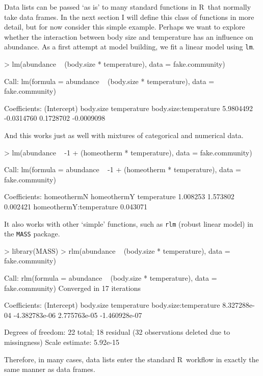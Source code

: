 \documentclass{article}
\newcommand{\R}{{\sf R}}
\newcommand{\code}[1]{\texttt{#1}}
\numberwithin{exercise}{section}
\begin{document}
Data lists can be passed `as is' to many standard functions in \R\ that normally take data frames.  In the next section I will define this class of functions in more detail, but for now consider this simple example.  Perhaps we want to explore whether the interaction between body size and temperature has an influence on abundance.  As a first attempt at model building, we fit a linear model using \code{lm}.
\begin{Schunk}
\begin{Sinput}
> lm(abundance ~ (body.size * temperature), data = fake.community)
\end{Sinput}
\begin{Soutput}
Call:
lm(formula = abundance ~ (body.size * temperature), data = fake.community)

Coefficients:
          (Intercept)              body.size            temperature  body.size:temperature  
            5.9804492             -0.0314760              0.1728702             -0.0009098  
\end{Soutput}
\end{Schunk}
And this works just as well with mixtures of categorical and numerical data.
\begin{Schunk}
\begin{Sinput}
> lm(abundance ~ -1 + (homeotherm * temperature), data = fake.community)
\end{Sinput}
\begin{Soutput}
Call:
lm(formula = abundance ~ -1 + (homeotherm * temperature), data = fake.community)

Coefficients:
            homeothermN              homeothermY              temperature  
               1.008253                 1.573802                 0.002421  
homeothermY:temperature  
               0.043071  
\end{Soutput}
\end{Schunk}
It also works with other `simple' functions, such as \code{rlm} (robust linear model) in the \code{MASS} package.
\begin{Schunk}
\begin{Sinput}
> library(MASS)
> rlm(abundance ~ (body.size * temperature), data = fake.community)
\end{Sinput}
\begin{Soutput}
Call:
rlm(formula = abundance ~ (body.size * temperature), data = fake.community)
Converged in 17 iterations

Coefficients:
          (Intercept)             body.size           temperature body.size:temperature 
         8.327288e-04         -4.382783e-06          2.775763e-05         -1.460928e-07 

Degrees of freedom: 22 total; 18 residual
  (32 observations deleted due to missingness)
Scale estimate: 5.92e-15 
\end{Soutput}
\end{Schunk}
\noindent Therefore, in many cases, data lists enter the standard \R\ workflow in exactly the same manner as data frames.
\end{document}
